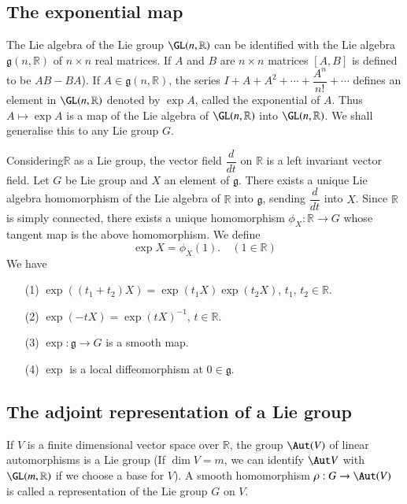 \subsection*{The exponential map}

The Lie algebra of the Lie group $\GL(n,\mathbb{R})$ can be identified with the Lie algebra $\mathfrak{g}(n,\mathbb{R})$ of $n\times n$ real matrices. If $A$ and $B$ are $n\times n$ matrices $[A,B]$ is defined to be $AB-BA$). If $A\in \mathfrak{g}(n,\mathbb{R})$, the series $I+A+A^{2}+\cdots+\dfrac{A^{n}}{n!}+\cdots$ defines an element in $\GL(n,\mathbb{R})$ denoted by $\exp A$, called the exponential of $A$. Thus $A\mapsto \exp A$ is a map of the Lie algebra of $\GL(n,\mathbb{R})$ into $\GL(n,\mathbb{R})$. We shall generalise this to any Lie group $G$.

Considering\pageoriginale $\mathbb{R}$ as a Lie group, the vector field $\dfrac{d}{dt}$ on $\mathbb{R}$ is a left invariant vector field. Let $G$ be Lie group and $X$ an element of $\mathfrak{g}$. There exists a unique Lie algebra homomorphism of the Lie algebra of $\mathbb{R}$ into $\mathfrak{g}$, sending $\dfrac{d}{dt}$ into $X$. Since $\mathbb{R}$ is simply connected, there exists a unique homomorphism $\phi_{X}:\mathbb{R}\to G$ whose tangent map is the above homomorphism. We define
\begin{equation*}
\exp X=\phi_{X}(1).\quad (1\in \mathbb{R})
\end{equation*}
We have
\begin{itemize}
\item[(1)] $\exp((t_{1}+t_{2})X)=\exp(t_{1}X)\exp(t_{2}X)$, $t_{1}$, $t_{2}\in \mathbb{R}$.

\item[(2)] $\exp(-tX)=\exp(tX)^{-1}$, $t\in \mathbb{R}$.

\item[(3)] $\exp :\mathfrak{g}\to G$ is a smooth map.

\item[(4)] $\exp$ is a local diffeomorphism at $0\in \mathfrak{g}$.
\end{itemize}

\subsection*{The adjoint representation of a Lie group}

If $V$ is a finite dimensional vector space over $\mathbb{R}$, the group $\Aut(V)$ of linear automorphisms is a Lie group (If $\dim V=m$, we can identify $\Aut V$ with $\GL(m,\mathbb{R})$ if we choose a base for $V$). A smooth homomorphism $\rho:G\to \Aut(V)$ is called a representation of the Lie group $G$ on $V$.

